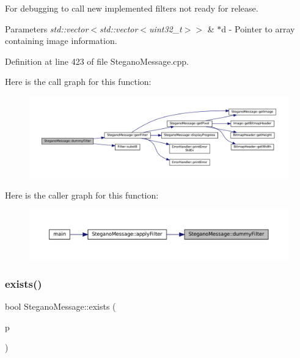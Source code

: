 For debugging to call new implemented filters not ready for release. 


\begin{DoxyParams}{Parameters}
{\em std\+::vector$<$std\+::vector$<$uint32\+\_\+t$>$$>$} & $\ast$d -\/ Pointer to array containing image information. \\
\hline
\end{DoxyParams}


Definition at line 423 of file Stegano\+Message.\+cpp.

Here is the call graph for this function\+:
\nopagebreak
\begin{figure}[H]
\begin{center}
\leavevmode
\includegraphics[width=350pt]{classSteganoMessage_a1a26242c2e6d146cba1ad6831ab60ba7_cgraph}
\end{center}
\end{figure}
Here is the caller graph for this function\+:
\nopagebreak
\begin{figure}[H]
\begin{center}
\leavevmode
\includegraphics[width=350pt]{classSteganoMessage_a1a26242c2e6d146cba1ad6831ab60ba7_icgraph}
\end{center}
\end{figure}
\mbox{\label{classSteganoMessage_acc5a49a35b46d8bf4c40cca8b8c5a52b}} 
\subsubsection{\texorpdfstring{exists()}{exists()}}
{\footnotesize\ttfamily bool Stegano\+Message\+::exists (\begin{DoxyParamCaption}\item[{std\+::string}]{p }\end{DoxyParamCaption})}



